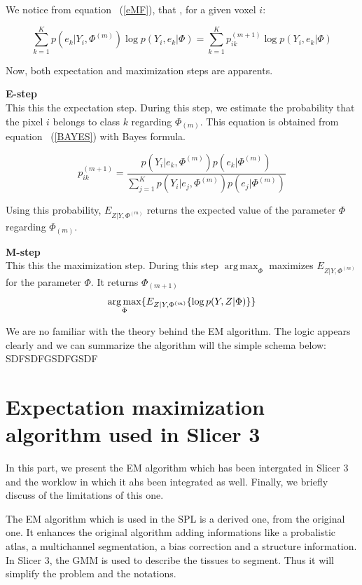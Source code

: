 We notice from equation ~(\ref{eMF}), that , for a given voxel $i$:

  \begin{equation}\label{BAYES}
  \sum_{k=1}^K   p(e_{k}|Y_i,\Phi^{(m)})\operatorname*{log} p(Y_i,e_{k}|\Phi) = \sum_{k=1}^K   p_{ik}^{(m+1)}\operatorname*{log} p(Y_i,e_{k}|\Phi)
  \end{equation}

Now, both expectation and maximization steps are apparents.\\
\par
\textbf{E-step}\\
This this the expectation step. During this step, we estimate the probability that the pixel $i$ belongs to class $k$ regarding $\Phi_{(m)}$. This equation is obtained from equation ~(\ref{BAYES}) with Bayes formula.

  \begin{equation}\label{ESTEP1}
  p_{ik}^{(m+1)} = \frac{p(Y_i|e_k,\Phi^{(m)})p(e_k|\Phi^{(m)})}{\sum_{j=1}^K   p(Y_i|e_j,\Phi^{(m)}) p(e_{j}|\Phi^{(m)})}  
  \end{equation}

Using this probability, $E_{Z|Y,\Phi^{(m)}}$ returns the expected value of the parameter $\Phi$ regarding $\Phi_{(m)}$.\\

\par
\textbf{M-step}\\
This this the maximization step. During this step $\operatorname*{arg\,max}_\Phi$ maximizes $E_{Z|Y,\Phi^{(m)}}$ for the parameter $\Phi$. It returns $\Phi_{(m+1)}$
  \begin{equation}
  \operatorname*{arg\,max}_\Phi \{ E_{Z|Y,\Phi^{(m)}} \{\operatorname*{log} p(Y,Z|\Phi)\}\}\\
  \end{equation}
  
  We are no familiar with the theory behind the EM algorithm. The logic appears clearly and we can summarize the algorithm will the simple schema below:
  SDFSDFGSDFGSDF 

\section{Expectation maximization algorithm used in Slicer 3}\label{angels}
In this part, we present the EM algorithm which has been intergated in Slicer 3 and the worklow in which it ahs been integrated as well. Finally, we briefly discuss of the limitations of this one.
\par
The EM algorithm which is used in the SPL is a derived one, from the original one. It enhances the original algorithm adding informations like a probalistic atlas, a multichannel segmentation, a bias correction and a structure information. In Slicer 3, the GMM is used to describe the tissues to segment. Thus it will simplify the problem and the notations.
%
